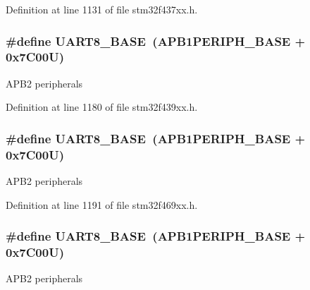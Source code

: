Definition at line 1131 of file stm32f437xx.\+h.

\subsubsection[{\texorpdfstring{U\+A\+R\+T8\+\_\+\+B\+A\+SE}{UART8_BASE}}]{\setlength{\rightskip}{0pt plus 5cm}\#define U\+A\+R\+T8\+\_\+\+B\+A\+SE~({\bf A\+P\+B1\+P\+E\+R\+I\+P\+H\+\_\+\+B\+A\+SE} + 0x7\+C00\+U)}\hypertarget{group___peripheral__memory__map_gac9c6cd59a248941d9d2462ab21a2346e}{}\label{group___peripheral__memory__map_gac9c6cd59a248941d9d2462ab21a2346e}
A\+P\+B2 peripherals 

Definition at line 1180 of file stm32f439xx.\+h.

\subsubsection[{\texorpdfstring{U\+A\+R\+T8\+\_\+\+B\+A\+SE}{UART8_BASE}}]{\setlength{\rightskip}{0pt plus 5cm}\#define U\+A\+R\+T8\+\_\+\+B\+A\+SE~({\bf A\+P\+B1\+P\+E\+R\+I\+P\+H\+\_\+\+B\+A\+SE} + 0x7\+C00\+U)}\hypertarget{group___peripheral__memory__map_gac9c6cd59a248941d9d2462ab21a2346e}{}\label{group___peripheral__memory__map_gac9c6cd59a248941d9d2462ab21a2346e}
A\+P\+B2 peripherals 

Definition at line 1191 of file stm32f469xx.\+h.

\subsubsection[{\texorpdfstring{U\+A\+R\+T8\+\_\+\+B\+A\+SE}{UART8_BASE}}]{\setlength{\rightskip}{0pt plus 5cm}\#define U\+A\+R\+T8\+\_\+\+B\+A\+SE~({\bf A\+P\+B1\+P\+E\+R\+I\+P\+H\+\_\+\+B\+A\+SE} + 0x7\+C00\+U)}\hypertarget{group___peripheral__memory__map_gac9c6cd59a248941d9d2462ab21a2346e}{}\label{group___peripheral__memory__map_gac9c6cd59a248941d9d2462ab21a2346e}
A\+P\+B2 peripherals 

